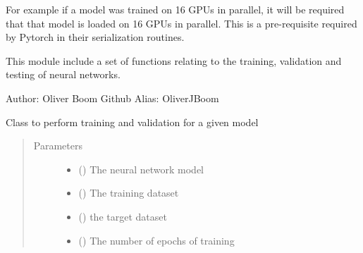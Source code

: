 \documentclass[letterpaper,10pt,english]{sphinxmanual}
\begin{document}
For example if a model was trained on 16 GPUs in parallel, it will be required
that that model is loaded on 16 GPUs in parallel. This is a pre-requisite
required by Pytorch in their serialization routines.

\label{\detokenize{deeplearning:module-Foresight.deeplearning}}
This module include a set of functions relating to the training,
validation and testing of neural networks.

Author: Oliver Boom
Github Alias: OliverJBoom

\begin{fulllineitems}
\label{\detokenize{deeplearning:Foresight.deeplearning.DeepLearning}}
Class to perform training and validation for a given model
\begin{quote}\begin{description}
\item[{Parameters}] \leavevmode\begin{itemize}
\item {} 
 () \textendash{} The neural network model

\item {} 
 () \textendash{} The training dataset

\item {} 
 () \textendash{} the target dataset

\item {} 
 () \textendash{} The number of epochs of training


\end{itemize}
\end{description}
\end{quote}
\end{fulllineitems}
\end{document}
